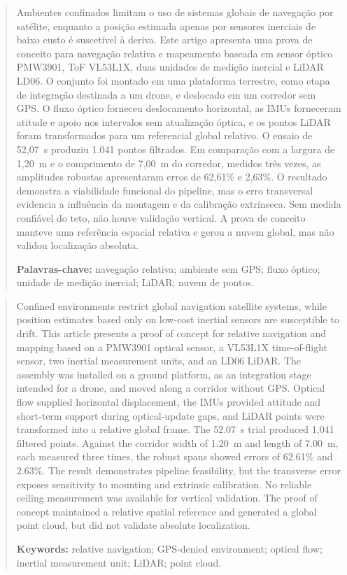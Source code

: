 \begin{abstract}
Ambientes confinados limitam o uso de sistemas globais de navegação por satélite, enquanto a posição estimada apenas por sensores inerciais de baixo custo é suscetível à deriva. Este artigo apresenta uma prova de conceito para navegação relativa e mapeamento baseada em sensor óptico PMW3901, ToF VL53L1X, duas unidades de medição inercial e LiDAR LD06. O conjunto foi montado em uma plataforma terrestre, como etapa de integração destinada a um drone, e deslocado em um corredor sem GPS. O fluxo óptico forneceu deslocamento horizontal, as IMUs forneceram atitude e apoio nos intervalos sem atualização óptica, e os pontos LiDAR foram transformados para um referencial global relativo. O ensaio de 52,07~s produziu 1.041 pontos filtrados. Em comparação com a largura de 1,20~m e o comprimento de 7,00~m do corredor, medidos três vezes, as amplitudes robustas apresentaram erros de 62,61\% e 2,63\%. O resultado demonstra a viabilidade funcional do pipeline, mas o erro transversal evidencia a influência da montagem e da calibração extrínseca. Sem medida confiável do teto, não houve validação vertical. A prova de conceito manteve uma referência espacial relativa e gerou a nuvem global, mas não validou localização absoluta.

\noindent\textbf{Palavras-chave:} navegação relativa; ambiente sem GPS; fluxo óptico; unidade de medição inercial; LiDAR; nuvem de pontos.
\end{abstract}

\begin{abstract}
Confined environments restrict global navigation satellite systems, while position estimates based only on low-cost inertial sensors are susceptible to drift. This article presents a proof of concept for relative navigation and mapping based on a PMW3901 optical sensor, a VL53L1X time-of-flight sensor, two inertial measurement units, and an LD06 LiDAR. The assembly was installed on a ground platform, as an integration stage intended for a drone, and moved along a corridor without GPS. Optical flow supplied horizontal displacement, the IMUs provided attitude and short-term support during optical-update gaps, and LiDAR points were transformed into a relative global frame. The 52.07~s trial produced 1,041 filtered points. Against the corridor width of 1.20~m and length of 7.00~m, each measured three times, the robust spans showed errors of 62.61\% and 2.63\%. The result demonstrates pipeline feasibility, but the transverse error exposes sensitivity to mounting and extrinsic calibration. No reliable ceiling measurement was available for vertical validation. The proof of concept maintained a relative spatial reference and generated a global point cloud, but did not validate absolute localization.

\noindent\textbf{Keywords:} relative navigation; GPS-denied environment; optical flow; inertial measurement unit; LiDAR; point cloud.
\end{abstract}
